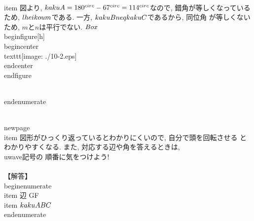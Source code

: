 	\\item 図より, $\\kaku{A} = 180^{\\circ} - 67^{\\circ} =
	      114^{\\circ}$なので, 錯角が等しくなっているため, $l \\heikou
	      m$である. 一方, $\\kaku{B} \\neq \\kaku{C}$であるから, 同位角
	      が等しくないため, $m$と$n$は平行でない. $\\Box$
	      \\begin{figure}[h]
	       \\begin{center}
		\\texttt{[image: ./10-2.eps]}
	       \\end{center}
	      \\end{figure}

       \\end{enumerate}

 \\newpage
 \\item 図形がひっくり返っているとわかりにくいので, 自分で頭を回転させる
       とわかりやすくなる. また, 対応する辺や角を答えるときは, \\uwave{記号の
       順番}に気をつけよう!\\\\ 
       【解答】
       \\begin{enumerate}
	\\item 辺 GF
	\\item $\\kaku{ABC}$
       \\end{enumerate}

